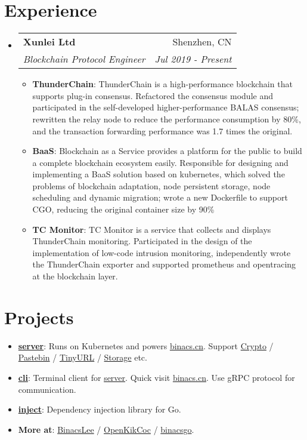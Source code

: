 \documentclass[letterpaper,12pt]{article}
\makeatletter
\newcommand{\resumeItem}[2]{
  \item\small{
    \textbf{#1}{: #2 \vspace{-2pt}}
  }
}
\newcommand{\resumeSubheading}[4]{
  \vspace{-1pt}\item
    \begin{tabular*}{0.97\textwidth}[t]{l@{\extracolsep{\fill}}r}
      \textbf{#1} & #2 \\
      \textit{\small#3} & \textit{\small #4} \\
    \end{tabular*}\vspace{-5pt}
}
\newcommand{\resumeSubItem}[2]{\resumeItem{#1}{#2}\vspace{-4pt}}
\newcommand{\resumeSubHeadingListStart}{\begin{itemize}[leftmargin=*]}
\newcommand{\resumeSubHeadingListEnd}{\end{itemize}}
\newcommand{\resumeItemListStart}{\begin{itemize}}
\newcommand{\resumeItemListEnd}{\end{itemize}\vspace{-5pt}}
\makeatother
\begin{document}
\section{Experience}
  \resumeSubHeadingListStart
    \resumeSubheading
      {Xunlei Ltd}{Shenzhen, CN}
      {Blockchain Protocol Engineer}{Jul 2019 - Present}
      \resumeItemListStart
        \resumeItem{ThunderChain}
          {ThunderChain is a high-performance blockchain that supports plug-in consensus.
          Refactored the consensus module and participated in the self-developed higher-performance
          BALAS consensus; rewritten the relay node to reduce the performance consumption by 80\%,
          and the transaction forwarding performance was 1.7 times the original.}
        \resumeItem{BaaS}
          {Blockchain as a Service provides a platform for the public to build a
          complete blockchain ecosystem easily.
          Responsible for designing and implementing a BaaS solution based on kubernetes, which solved the 
          problems of blockchain adaptation, node persistent storage, node scheduling and dynamic migration; 
          wrote a new Dockerfile to support CGO, reducing the original container size by 90\%}
        \resumeItem{TC Monitor}
          {TC Monitor is a service that collects and displays ThunderChain monitoring. Participated in
          the design of the implementation of low-code intrusion monitoring, independently wrote the
          ThunderChain exporter and supported prometheus and opentracing at the blockchain layer.}
      \resumeItemListEnd
  \resumeSubHeadingListEnd

\section{Projects}
  \resumeSubHeadingListStart
    \resumeSubItem{\href{https://github.com/BinacsLee/server}{server}}
      {Runs on Kubernetes and powers \href{https://binacs.cn/}{binacs.cn}.
      Support   \href{https://binacs.cn/toys/crypto}{Crypto} / 
                \href{https://binacs.cn/toys/pastebin}{Pastebin} / 
                \href{https://binacs.cn/toys/tinyurl}{TinyURL} / 
                \href{https://binacs.cn/toys/storage}{Storage}
      etc.}
    \resumeSubItem{\href{https://github.com/BinacsLee/cli}{cli}}
      {Terminal client for \href{https://github.com/BinacsLee/server}{server}. Quick visit
      \href{https://binacs.cn/}{binacs.cn}. Use gRPC protocol for communication.}
    \resumeSubItem{\href{https://github.com/binacsgo/inject}{inject}}
      {Dependency injection library for Go.}
    \resumeSubItem{More at}
      {\href{https://github.com/BinacsLee}{BinacsLee} /
       \href{https://github.com/OpenKikCoc}{OpenKikCoc} /
       \href{https://github.com/binacsgo}{binacsgo}.}
  \resumeSubHeadingListEnd

\end{document}
